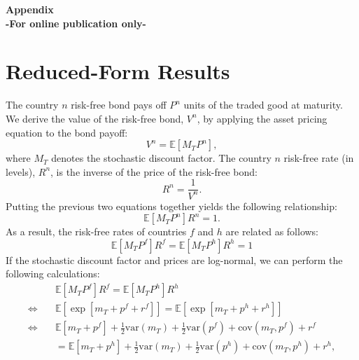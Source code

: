 \appendix

\begin{center}
  {\Huge\bf Appendix}\\
  {\large\bf -For online publication only-}
\end{center}

\section{Reduced-Form Results \label{Appendix_ReducedFormResults}}

The country $n$ risk-free bond pays off $P^n$ units of the traded good at maturity. We derive the value of the risk-free bond, $V^n$, by applying the asset pricing equation to the bond payoff: 
\begin{equation*}
  V^n = \mathbb{E}\left[M_{T} P^n
  \right],
\end{equation*}
where $M_{T}$ denotes the stochastic discount factor. The country $n$ risk-free rate (in levels), $R^n$, is the inverse of the price of the risk-free bond:
\begin{equation*}
  R^n = \frac{1}{V^n}.
\end{equation*}
Putting the previous two equations together yields the following relationship:
\begin{equation*}
  \mathbb{E}\left[ M_{T} P^n \right] R^n = 1.
\end{equation*}
As a result, the risk-free rates of countries $f$ and $h$ are related as follows:
\begin{equation*}
  \mathbb{E}\left[M_{T} P^f \right] R^f 
  = \mathbb{E}\left[M_{T} P^h \right] R^h = 1
\end{equation*} 
If the stochastic discount factor and prices are log-normal, we can perform the following calculations:
\begin{align*}
  & \mathbb{E}\left[M_{T} P^f \right] R^f
    = \mathbb{E}\left[M_{T} P^h \right] R^h \\
  \Leftrightarrow\quad
  & \mathbb{E}\left[\exp\left[ m_T + p^f + r^f \right]\right]
    = \mathbb{E}\left[\exp\left[ m_T + p^h + r^h \right]\right] \\
  \Leftrightarrow\quad
  & \mathbb{E}\left[m_T + p^f\right] + \frac{1}{2}\text{var}\left(m_T\right) +      \frac{1}{2}\text{var}\left(p^f\right) + \text{cov}\left(m_{T}, p^f\right) + r^f \\
  & = \mathbb{E}\left[m_{T}+ p^h\right] + \frac{1}{2}\text{var}\left(m_{T}\right) + \frac{1}{2}\text{var}\left(p^h\right) + \text{cov}\left(m_T, p^h\right) + r^h,
\end{align*}
